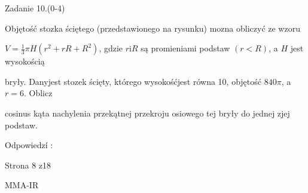 \documentclass[a4paper,12pt]{article}
\begin{document}
Zadanie 10.(0-4)

Objętość stozka ściętego (przedstawionego na rysunku) mozna obliczyć ze wzoru

$V=\displaystyle \frac{1}{3}\pi H(r^{2}+rR+R^{2})$, gdzie $r\mathrm{i}R$ są promieniami podstaw $(r<R)$, a $H$ jest wysokością

bryły. Danyjest stozek ścięty, którego wysokośćjest równa 10, objętość $ 840\pi$, a $r=6$. Oblicz

cosinus kąta nachylenia przekątnej przekroju osiowego tej bryły do jednej zjej podstaw.

Odpowiedzí :

Strona 8 z18

MMA-IR
\end{document}
